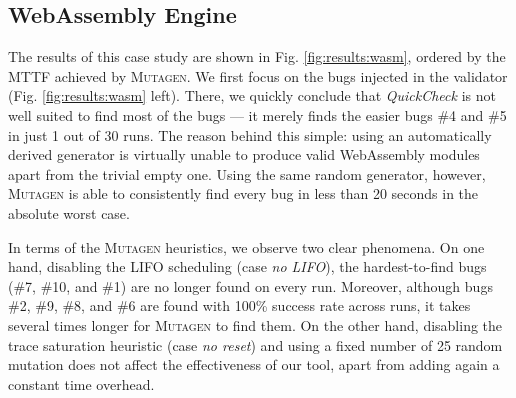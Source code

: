\documentclass[sigconf,review,anonymous]{acmart}
\newcommand{\quickcheck}{\textit{QuickCheck}\xspace}
\newcommand{\mutagen}{\textsc{Mutagen}\xspace}
\begin{document}
\subsection{WebAssembly Engine}

The results of this case study are shown in Fig. \ref{fig:results:wasm}, ordered
by the MTTF achieved by \mutagen.
%
We first focus on the bugs injected in the validator (Fig.
\ref{fig:results:wasm} left).
%
There, we quickly conclude that \quickcheck is not well suited to find most of
the bugs --- it merely finds the easier bugs \#4 and \#5 in just 1 out of 30
runs.
%
The reason behind this simple:
%
%
using an automatically derived generator is virtually unable to produce valid
WebAssembly modules apart from the trivial empty one.
%
Using the same random generator, however, \mutagen is able to consistently find
every bug in less than 20 seconds in the absolute worst case.


In terms of the \mutagen heuristics, we observe two clear phenomena.
%
On one hand, disabling the LIFO scheduling (case \textit{no LIFO}), the
hardest-to-find bugs (\#7, \#10, and \#1) are no longer found on every run.
%
Moreover, although bugs \#2, \#9, \#8, and \#6 are found with 100\% success rate
across runs, it takes several times longer for \mutagen to find them.
%
On the other hand, disabling the trace saturation heuristic (case \textit{no
  reset}) and using a fixed number of 25 random mutation does not affect the
effectiveness of our tool, apart from adding again a constant time overhead.
\end{document}
